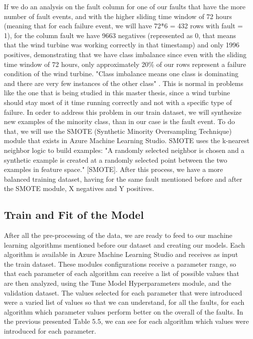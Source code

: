 If we do an analysis on the fault column for one of our faults that have the more number of fault events, and with the higher sliding time window of 72 hours (meaning that for each failure event, we will have 72*6 = 432 rows with fault = 1), for the column fault we have 9663 negatives (represented as 0, that means that the wind turbine was working correctly in that timestamp) and only 1996 positives, demonstrating that we have class imbalance since even with the sliding time window of 72 hours, only approximately 20\% of our rows represent a failure condition of the wind turbine.
"Class imbalance means one class is dominating and there are very few instances of the other class" \cite{ML_Data_processing}. This is normal in problems like the one that is being studied in this master thesis, since a wind turbine should stay most of it time running correctly and not with a specific type of failure.
In order to address this problem in our train dataset, we will synthesize new examples of the minority class, than in our case is the fault event. To do that, we will use the SMOTE (Synthetic Minority Oversampling Technique) module that exists in Azure Machine Learning Studio. SMOTE uses the k-nearest neighbor logic to build examples: "A randomly selected neighbor is chosen and a synthetic example is created at a randomly selected point between the two examples in feature space." [SMOTE].
After this process, we have a more balanced training dataset, having for the same fault mentioned before and after the SMOTE module, X negatives and Y positives.


\subsection{Train and Fit of the Model}
After all the pre-processing of the data, we are ready to feed to our machine learning algorithms mentioned before our dataset and creating our models. Each algorithm is available in Azure Machine Learning Studio and receives as input the train dataset. These modules configurations receive a parameter range, so that each parameter of each algorithm can receive a list of possible values that are then analyzed, using the Tune Model Hyperparameters module, and the validation dataset. 
The values selected for each parameter that were introduced were a varied list of values so that we can understand, for all the faults, for each algorithm which parameter values perform better on the overall of the faults.
In the previous presented Table 5.5, we can see for each algorithm which values were introduced for each parameter.

